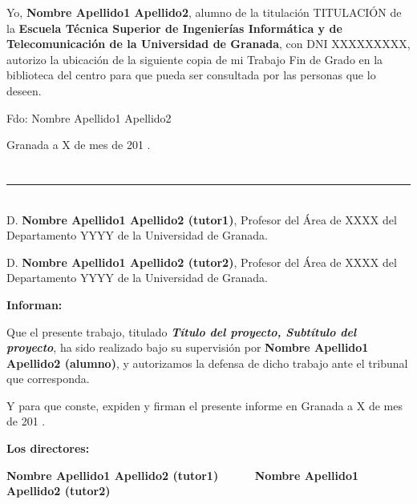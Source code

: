 Yo, \textbf{Nombre Apellido1 Apellido2}, alumno de la titulación TITULACIÓN de la \textbf{Escuela Técnica Superior
de Ingenierías Informática y de Telecomunicación de la Universidad de Granada}, con DNI XXXXXXXXX, autorizo la
ubicación de la siguiente copia de mi Trabajo Fin de Grado en la biblioteca del centro para que pueda ser
consultada por las personas que lo deseen.

\vspace{6cm}

\noindent Fdo: Nombre Apellido1 Apellido2

\vspace{2cm}

\begin{flushright}
Granada a X de mes de 201 .
\end{flushright}


\chapter*{}
\thispagestyle{empty}

\noindent\rule[-1ex]{\textwidth}{2pt}\\[4.5ex]

D. \textbf{Nombre Apellido1 Apellido2 (tutor1)}, Profesor del Área de XXXX del Departamento YYYY de la Universidad de Granada.

\vspace{0.5cm}

D. \textbf{Nombre Apellido1 Apellido2 (tutor2)}, Profesor del Área de XXXX del Departamento YYYY de la Universidad de Granada.


\vspace{0.5cm}

\textbf{Informan:}

\vspace{0.5cm}

Que el presente trabajo, titulado \textit{\textbf{Título del proyecto, Subtítulo del proyecto}},
ha sido realizado bajo su supervisión por \textbf{Nombre Apellido1 Apellido2 (alumno)}, y autorizamos la defensa de dicho trabajo ante el tribunal
que corresponda.

\vspace{0.5cm}

Y para que conste, expiden y firman el presente informe en Granada a X de mes de 201 .

\vspace{1cm}

\textbf{Los directores:}

\vspace{5cm}

\noindent \textbf{Nombre Apellido1 Apellido2 (tutor1) \ \ \ \ \ Nombre Apellido1 Apellido2 (tutor2)}





